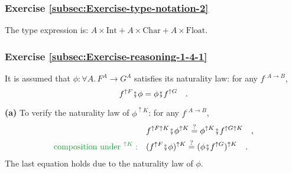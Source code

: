 
\subsubsection*{Exercise \ref{subsec:Exercise-type-notation-2}}

The type expression is: $A\times\text{Int}+A\times\text{Char}+A\times\text{Float}$.


\subsubsection*{Exercise \ref{subsec:Exercise-reasoning-1-4-1}}

It is assumed that $\phi:\forall A.\,F^{A}\rightarrow G^{A}$ satisfies
its naturality law: for any $f^{:A\rightarrow B}$,
\[
f^{\uparrow F}\bef\phi=\phi\bef f^{\uparrow G}\quad.
\]

\textbf{(a)} To verify the naturality law of $\phi^{\uparrow K}$:
for any $f^{:A\rightarrow B}$,
\begin{align*}
 & f^{\uparrow F\uparrow K}\bef\phi^{\uparrow K}\overset{?}{=}\phi^{\uparrow K}\bef f^{\uparrow G\uparrow K}\quad,\\
{\color{greenunder}\text{composition under }^{\uparrow K}:}\quad & (f^{\uparrow F}\bef\phi)^{\uparrow K}\overset{?}{=}(\phi\bef f^{\uparrow G})^{\uparrow K}\quad.
\end{align*}
The last equation holds due to the naturality law of $\phi$.

